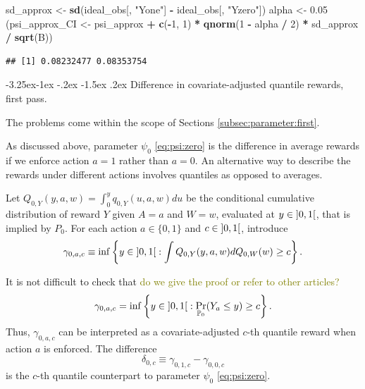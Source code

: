 \documentclass[]{article}
\makeatletter
\newenvironment{Shaded}{\begin{snugshade}}{\end{snugshade}}
\newcommand{\DecValTok}[1]{\textcolor[rgb]{0.00,0.00,0.81}{#1}}
\newcommand{\FloatTok}[1]{\textcolor[rgb]{0.00,0.00,0.81}{#1}}
\newcommand{\KeywordTok}[1]{\textcolor[rgb]{0.13,0.29,0.53}{\textbf{#1}}}
\newcommand{\NormalTok}[1]{#1}
\newcommand{\OperatorTok}[1]{\textcolor[rgb]{0.81,0.36,0.00}{\textbf{#1}}}
\newcommand{\StringTok}[1]{\textcolor[rgb]{0.31,0.60,0.02}{#1}}
\renewcommand\subsection{\@startsection{subsection}{3}{\z@}%
                                     {-3.25ex\@plus -1ex \@minus -.2ex}%
                                     {-1.5ex \@plus .2ex}%
                                     {\normalfont\normalsize\bfseries}}
\newcommand{\gear}{\usebox{\gearbox}\;}
\newcommand{\bbP}{\mathbb{P}}
\newcommand{\tcg}[1]{\textcolor{olive}{#1}}
\theoremstyle{definition}
\theoremstyle{definition}
\theoremstyle{definition}
\theoremstyle{remark}
\makeatother
\begin{document}
\begin{Shaded}
\begin{Highlighting}[]
\NormalTok{sd_approx <-}\StringTok{ }\KeywordTok{sd}\NormalTok{(ideal_obs[, }\StringTok{"Yone"}\NormalTok{] }\OperatorTok{-}\StringTok{ }\NormalTok{ideal_obs[, }\StringTok{"Yzero"}\NormalTok{])}
\NormalTok{alpha <-}\StringTok{ }\FloatTok{0.05}
\NormalTok{(psi_approx_CI <-}\StringTok{ }\NormalTok{psi_approx }\OperatorTok{+}\StringTok{ }\KeywordTok{c}\NormalTok{(}\OperatorTok{-}\DecValTok{1}\NormalTok{, }\DecValTok{1}\NormalTok{) }\OperatorTok{*}\StringTok{ }\KeywordTok{qnorm}\NormalTok{(}\DecValTok{1} \OperatorTok{-}\StringTok{ }\NormalTok{alpha }\OperatorTok{/}\StringTok{ }\DecValTok{2}\NormalTok{) }\OperatorTok{*}\StringTok{ }\NormalTok{sd_approx }\OperatorTok{/}\StringTok{ }\KeywordTok{sqrt}\NormalTok{(B))}
\end{Highlighting}
\end{Shaded}

\begin{verbatim}
## [1] 0.08232477 0.08353754
\end{verbatim}

\subsection{\gear Difference in covariate-adjusted quantile rewards, first
pass.}  
\label{subsec:exo:dave:one}

The problems come within the scope of Sections
\ref{subsec:parameter:first}.

As discussed above, parameter \(\psi_0\) \eqref{eq:psi:zero} is the
difference in average rewards if we enforce action \(a = 1\) rather than
\(a = 0\). An alternative way to describe the rewards under different
actions involves quantiles as opposed to averages.

Let \(Q_{0,Y}(y, a, w) = \int_{0}^y q_{0,Y}(u, a, w) du\) be the
conditional cumulative distribution of reward \(Y\) given \(A=a\) and
\(W=w\), evaluated at \(y \in \interval[open]{0}{1}\), that is implied
by \(P_0\). For each action \(a \in \{0,1\}\) and
\(c \in \interval[open]{0}{1}\), introduce \begin{equation}
\label{def_quantile}     \gamma_{0,a,c}    \equiv     \inf    \left\{y     \in
\interval[open]{0}{1}  : \int  Q_{0,Y}(y, a,  w) dQ_{0,W}(w)  \ge c  \right\}.
\end{equation}

It is not difficult to check that
\tcg{do  we give the proof or refer to other
articles?}
\begin{equation*}\gamma_{0,a,c}     =     \inf\left\{y     \in
\interval[open]{0}{1}      :      \Pr_{\bbP_{0}}(Y_a     \leq      y)      \geq
c\right\}.\end{equation*} Thus, \(\gamma_{0,a,c}\) can be interpreted as
a covariate-adjusted \(c\)-th quantile reward when action \(a\) is
enforced. The difference
\begin{equation*}\delta_{0,c}    \equiv     \gamma_{0,1,c}    -
\gamma_{0,0,c}\end{equation*} is the \(c\)-th quantile counterpart to
parameter \(\psi_{0}\) \eqref{eq:psi:zero}.
\end{document}
